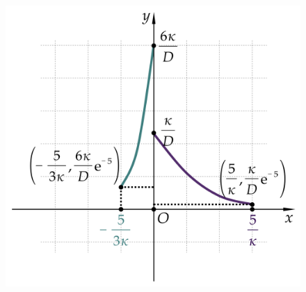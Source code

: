 \begin{exercise}
\begin{solution}
\begin{enumerate}[(1)]
\begin{figure}[H]
                \includegraphics[scale=0.8]{figures/fig4.9-3.png}
            \end{figure}
        \end{enumerate}
    \end{solution}
\end{exercise}